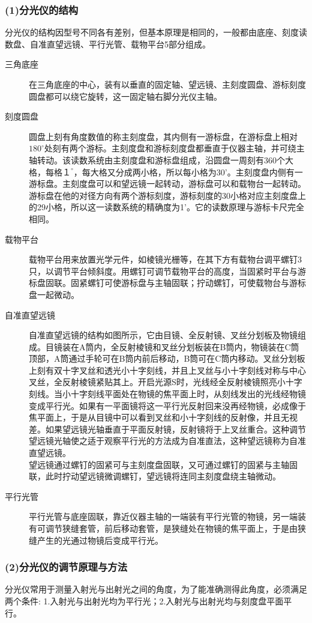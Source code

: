 \subsubsection*{(1)分光仪的结构}
分光仪的结构因型号不同各有差别，但基本原理是相同的，一般都由底座、刻度读数盘、自准直望远镜、平行光管、载物平台5部分组成。
\begin{description}
\item[三角底座] 在三角底座的中心，装有以垂直的固定轴、望远镜、主刻度圆盘、游标刻度圆盘都可以绕它旋转，这一固定轴右脚分光仪主轴。
\item[刻度圆盘] 圆盘上刻有角度数值的称主刻度盘，其内侧有一游标盘，在游标盘上相对$180^{\circ}$处刻有两个游标。主刻度盘和游标刻度盘都垂直于仪器主轴，并可绕主轴转动。该读数系统由主刻度盘和游标盘组成，沿圆盘一周刻有360个大格，每格$１^{\circ}$，每大格又分成两小格，所以每小格为30'。主刻度盘内侧有一游标盘。主刻度盘可以和望远镜一起转动，游标盘可以和载物台一起转动。游标盘在他的对径方向有两个游标刻度，游标刻度的30小格对应主刻度盘上的29小格，所以这一读数系统的精确度为1’。它的读数原理与游标卡尺完全相同。
\item[载物平台] 载物平台用来放置光学元件，如棱镜光栅等，在其下方有载物台调平螺钉3只，以调节平台倾斜度。用螺钉可调节载物平台的高度，当固紧时平台与游标盘固联。固紧螺钉可使游标盘与主轴固联；拧动螺钉，可使载物台与游标盘一起微动。
\item[自准直望远镜] 自准直望远镜的结构如图所示，它由目镜、全反射镜、叉丝分划板及物镜组成。目镜装在A筒内，全反射棱镜和叉丝分划板装在B筒内，物镜装在C筒顶部，A筒通过手轮可在B筒内前后移动，B筒可在C筒内移动。叉丝分划板上刻有双十字叉丝和透光小十字刻线，并且上叉丝与小十字刻线对称与中心叉丝，全反射棱镜紧贴其上。开启光源S时，光线经全反射棱镜照亮小十字刻线。当小十字刻线平面处在物镜的焦平面上时，从刻线发出的光线经物镜变成平行光。如果有一平面镜将这一平行光反射回来没再经物镜，必成像于焦平面上，于是从目镜中可以看到叉丝和小十字刻线的反射像，并且无视差。如果望远镜光轴垂直于平面反射镜，反射镜将于上叉丝重合。这种调节望远镜光轴使之适于观察平行光的方法成为自准直法，这种望远镜称为自准直望远镜。\\望远镜通过螺钉的固紧可与主刻度盘固联，又可通过螺钉的固紧与主轴固联，此时拧动望远镜微调螺钉，望远镜将连同主刻度盘绕主轴微动。
\item[平行光管] 平行光管与底座固联，靠近仪器主轴的一端装有平行光管的物镜，另一端装有可调节狭缝套管，前后移动套管，是狭缝处在物镜的焦平面上，于是由狭缝产生的光通过物镜后变成平行光。
\end{description}

\subsubsection*{(2)分光仪的调节原理与方法}
分光仪常用于测量入射光与出射光之间的角度，为了能准确测得此角度，必须满足两个条件:
1.入射光与出射光均为平行光；2.入射光与出射光均与刻度盘平面平行。


